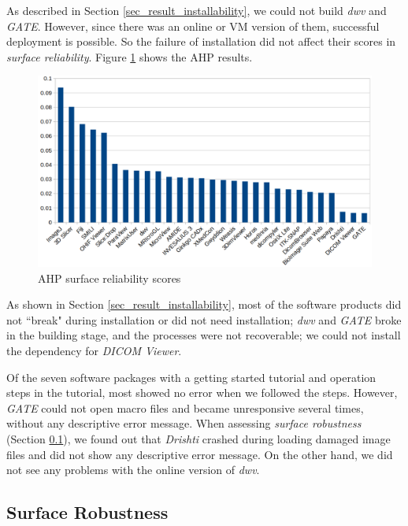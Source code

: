 \documentclass[3p, 12pt,authoryear]{elsarticle}
\begin{document}
As described in Section \ref{sec_result_installability}, we could not build
\textit{dwv} and \textit{GATE}. However, since there was an online or VM version
of them, successful deployment is possible. So the failure of installation did
not affect their scores in \textit{surface reliability}. Figure
\ref{fg_reliability_scores} shows the AHP results.

\begin{figure}[ht]
\includegraphics[scale=0.38]{figures/reliability_scores.png}
\caption{AHP surface reliability scores}
\label{fg_reliability_scores}
\end{figure}

As shown in Section \ref{sec_result_installability}, most of the software
products did not ``break" during installation or did not need installation;
\textit{dwv} and \textit{GATE} broke in the building stage, and the processes
were not recoverable; we could not install the dependency for \textit{DICOM
Viewer}.

Of the seven software packages with a getting started tutorial and operation
steps in the tutorial, most showed no error when we followed the steps. However,
\textit{GATE} could not open macro files and became unresponsive several times,
without any descriptive error message. When assessing \textit{surface
robustness} (Section \ref{sec_result_robustness}), we found out that
\textit{Drishti} crashed during loading damaged image files and did not show any
descriptive error message. On the other hand, we did not see any problems with
the online version of \textit{dwv}.

\subsection{Surface Robustness} \label{sec_result_robustness}
\end{document}

